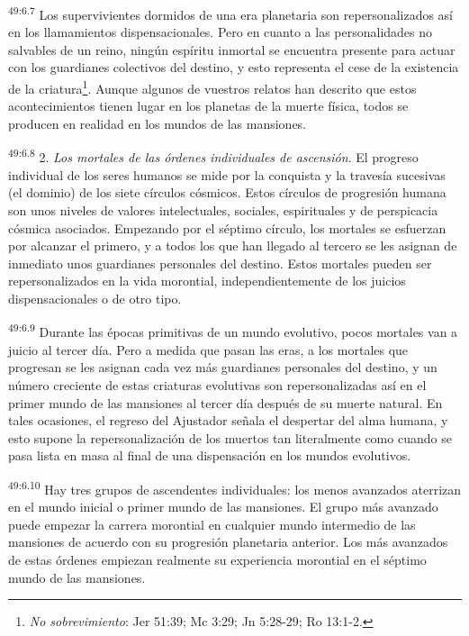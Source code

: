 \par
\textsuperscript{49:6.7} Los supervivientes dormidos de una era planetaria son repersonalizados así en los llamamientos dispensacionales. Pero en cuanto a las personalidades no salvables de un reino, ningún espíritu inmortal se encuentra presente para actuar con los guardianes colectivos del destino, y esto representa el cese de la existencia de la criatura\footnote{\textit{No sobrevimiento}: Jer 51:39; Mc 3:29; Jn 5:28-29; Ro 13:1-2.}. Aunque algunos de vuestros relatos han descrito que estos acontecimientos tienen lugar en los planetas de la muerte física, todos se producen en realidad en los mundos de las mansiones.

\par
\textsuperscript{49:6.8} 2. \textit{Los mortales de las órdenes individuales de ascensión}. El progreso individual de los seres humanos se mide por la conquista y la travesía sucesivas (el dominio) de los siete círculos cósmicos. Estos círculos de progresión humana son unos niveles de valores intelectuales, sociales, espirituales y de perspicacia cósmica asociados. Empezando por el séptimo círculo, los mortales se esfuerzan por alcanzar el primero, y a todos los que han llegado al tercero se les asignan de inmediato unos guardianes personales del destino. Estos mortales pueden ser repersonalizados en la vida morontial, independientemente de los juicios dispensacionales o de otro tipo.

\par
\textsuperscript{49:6.9} Durante las épocas primitivas de un mundo evolutivo, pocos mortales van a juicio al tercer día. Pero a medida que pasan las eras, a los mortales que progresan se les asignan cada vez más guardianes personales del destino, y un número creciente de estas criaturas evolutivas son repersonalizadas así en el primer mundo de las mansiones al tercer día después de su muerte natural. En tales ocasiones, el regreso del Ajustador señala el despertar del alma humana, y esto supone la repersonalización de los muertos tan literalmente como cuando se pasa lista en masa al final de una dispensación en los mundos evolutivos.

\par
\textsuperscript{49:6.10} Hay tres grupos de ascendentes individuales: los menos avanzados aterrizan en el mundo inicial o primer mundo de las mansiones. El grupo más avanzado puede empezar la carrera morontial en cualquier mundo intermedio de las mansiones de acuerdo con su progresión planetaria anterior. Los más avanzados de estas órdenes empiezan realmente su experiencia morontial en el séptimo mundo de las mansiones.

